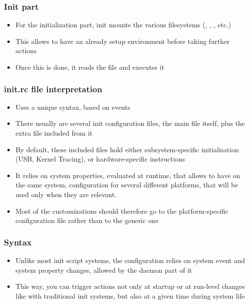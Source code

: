 \begin{frame}
  \frametitle{Init part}
  \begin{itemize}
  \item For the initialization part, init mounts the various
    filesystems (, , , etc.)
  \item This allows to have an already setup environment before taking
    further actions
  \item Once this is done, it reads the  file and
    executes it
  \end{itemize}
\end{frame}

\begin{frame}
  \frametitle{init.rc file interpretation}
  \begin{itemize}
  \item Uses a unique syntax, based on events
  \item There usually are several init configuration files, the main
     file itself, plus the extra file included from it
  \item By default, these included files hold either
    subsystem-specific initialisation (USB, Kernel Tracing), or
    hardware-specific instructions
  \item It relies on system properties, evaluated at runtime, that
    allows to have on the same system, configuration for several
    different platforms, that will be used only when they are
    relevant.
  \item Most of the customizations should therefore go to the
    platform-specific configuration file rather than to the generic
    one
  \end{itemize}
\end{frame}

\begin{frame}
  \frametitle{Syntax}
  \begin{itemize}
  \item Unlike most init script systems, the configuration relies on
    system event and system property changes, allowed by the
    daemon part of it
  \item This way, you can trigger actions not only at startup or at
    run-level changes like with traditional init systems, but also at
    a given time during system life
  \end{itemize}
\end{frame}


